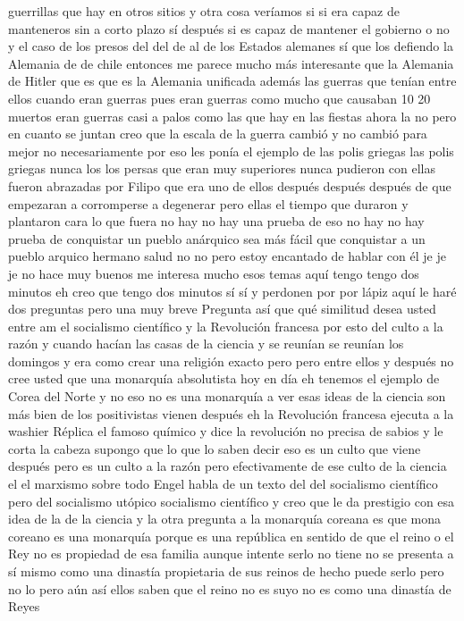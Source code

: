 guerrillas que hay en otros sitios y otra cosa veríamos si si era capaz de manteneros sin a corto plazo sí después si es capaz de mantener el gobierno o no
y el caso de los presos del del de al de los Estados alemanes sí que los defiendo la Alemania de de chile entonces me parece mucho más interesante
que la Alemania de Hitler que es que es la Alemania unificada además las guerras que tenían entre ellos cuando eran guerras
pues eran guerras como mucho que causaban 10 20 muertos eran guerras casi a palos como las que hay en las fiestas ahora la no
pero en cuanto se juntan creo que la escala de la guerra cambió y no cambió para mejor
no necesariamente por eso les ponía el ejemplo de las polis griegas las polis griegas nunca los los persas que eran muy superiores
nunca pudieron con ellas fueron abrazadas por Filipo que era uno de ellos
después después después de que empezaran a corromperse a degenerar pero ellas el tiempo que duraron y plantaron cara
lo que fuera no hay no hay una prueba de eso no hay no hay prueba de conquistar un pueblo anárquico sea más fácil que conquistar a un pueblo arquico
hermano salud no no pero estoy encantado de hablar con él
je je je no hace muy buenos me interesa mucho esos temas aquí tengo tengo dos minutos eh
creo que tengo dos minutos sí sí y perdonen por por lápiz aquí le haré dos preguntas pero una muy breve
Pregunta
así que qué similitud desea usted entre am el socialismo científico y la Revolución francesa
por esto del culto a la razón y cuando hacían las casas de la ciencia y se reunían se reunían los domingos y era como crear una religión
exacto pero pero entre ellos y después no cree usted que una monarquía absolutista
hoy en día eh tenemos el ejemplo de Corea del Norte y no eso no es una monarquía
a ver esas ideas de la ciencia son más bien de los positivistas vienen después eh la Revolución francesa ejecuta a la washier
Réplica
el famoso químico y dice la revolución no precisa de sabios y le corta la cabeza supongo que lo que lo saben decir
eso es un culto que viene después pero es un culto a la razón pero efectivamente de ese culto de la ciencia el el marxismo sobre todo
Engel habla de un texto del del socialismo científico pero del socialismo utópico socialismo científico
y creo que le da prestigio con esa idea de la de la ciencia y la otra pregunta a la monarquía
coreana es que mona coreano es una monarquía porque es una república en sentido de que el reino o el Rey no es propiedad de esa familia
aunque intente serlo no tiene no se presenta a sí mismo como una dinastía propietaria de sus reinos
de hecho puede serlo pero no lo pero aún así ellos saben que el reino no es suyo no es como una dinastía de Reyes
